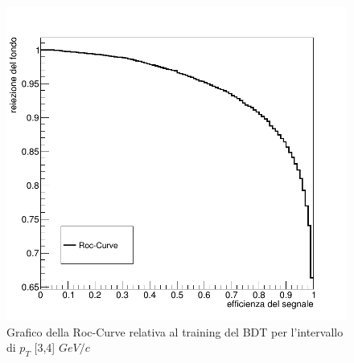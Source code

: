 \begin{figure}[htbp] 
        \centering
        \includegraphics[width=0.7\linewidth]{training&testing/RocCurve.png}
        \caption{Grafico della Roc-Curve relativa al training del BDT per l'intervallo di $p_T$ [3,4] $GeV/c$}
        \label{fig:RocCurve}
    \end{figure}
    
